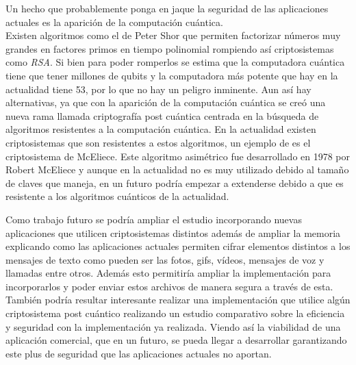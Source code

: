 Un hecho que probablemente ponga en jaque la seguridad de las aplicaciones actuales es la aparición de la computación cuántica.\\
Existen algoritmos como el de Peter Shor que permiten factorizar números muy grandes en factores primos en tiempo polinomial \cite{Shor1994} rompiendo así criptosistemas como \emph{RSA}. Si bien para poder romperlos se estima que la computadora cuántica tiene que tener millones de qubits y la computadora más potente que hay en la actualidad tiene 53, por lo que no hay un peligro inminente. Aun así hay alternativas, ya que con la aparición de la computación cuántica se creó una nueva rama llamada criptografía post cuántica centrada en la búsqueda de algoritmos resistentes a la computación cuántica. En la actualidad existen criptosistemas que son resistentes a estos algoritmos, un ejemplo de es el criptosistema de McEliece. Este algoritmo asimétrico fue desarrollado en 1978 por Robert McEliece y aunque en la actualidad no es muy utilizado debido al tamaño de claves que maneja, en un futuro podría empezar a extenderse debido a que es resistente a los algoritmos cuánticos de la actualidad.

Como trabajo futuro se podría ampliar el estudio incorporando nuevas aplicaciones que utilicen criptosistemas distintos además de ampliar la memoria explicando como las aplicaciones actuales permiten cifrar elementos distintos a los mensajes de texto como pueden ser las fotos, gifs, vídeos, mensajes de voz y llamadas entre otros. Además esto permitiría ampliar la implementación para incorporarlos y poder enviar estos archivos de manera segura a través de esta.\\
También podría resultar interesante realizar una implementación que utilice algún criptosistema post cuántico realizando un estudio comparativo sobre la eficiencia y seguridad con la implementación ya realizada. Viendo así la viabilidad de una aplicación comercial, que en un futuro, se pueda llegar a desarrollar garantizando este plus de seguridad que las aplicaciones actuales no aportan.

